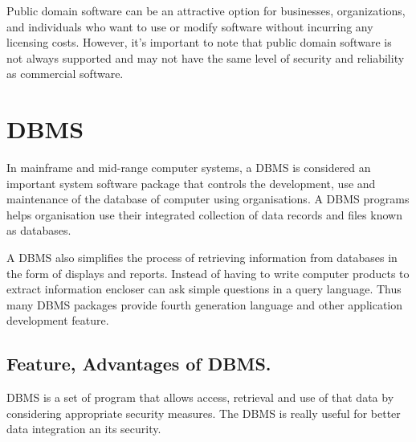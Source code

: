 \documentclass[twocolumn, 12pt, a4paper]{article}
\begin{document}
Public domain software can be an attractive option for businesses,
organizations, and individuals who want to use or modify software without
incurring any licensing costs. However, it's important to note that public
domain software is not always supported and may not have the same level of
security and reliability as commercial software.

\section{DBMS}

In mainframe and mid-range computer systems, a DBMS is considered an important system software package that controls the development, use and maintenance of the database of computer using organisations. A DBMS programs helps organisation use their integrated collection of data records and files known as databases.

A DBMS also simplifies the process of retrieving information from databases in the form of displays and reports. Instead of having to write computer products to extract information encloser can ask simple questions in a query language. Thus many DBMS packages provide fourth generation language and other application development feature.

\subsection{Feature, Advantages of DBMS.}
DBMS is a set of program that allows access, retrieval and use of that data by considering appropriate security measures. The DBMS is really useful for better data integration an its security.
\end{document}
